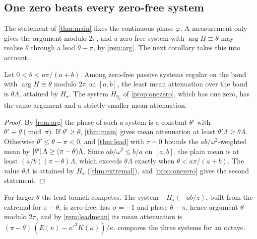 \subsection{One zero beats every zero-free system}

The statement of \cref{thm:main} fixes the continuous phase $\varphi$. A
measurement only gives the argument modulo $2\pi$, and a zero-free system
with $\arg H\equiv\theta$ may realise $\theta$ through a lead $\theta-\pi$, by
\cref{rem:arg}. The next corollary takes this into account.

\begin{corollary}\label{cor:zerosbeat}
Let $0<\theta<a\pi/(a+b)$. Among zero-free passive systems regular on the
band with $\arg H\equiv\theta$ modulo $2\pi$ on $[a,b]$, the least mean
attenuation over the band is $\theta\Lambda$, attained by $H_\star$. The
system $H_{\eta_\theta}$ of \cref{prop:onezero}, which has one zero, has the
same argument and a strictly smaller mean attenuation.
\end{corollary}

\begin{proof}
By \cref{rem:arg} the phase of such a system is a constant $\theta'$ with
$\theta'\equiv\theta\pmod\pi$. If $\theta'\ge\theta$, \cref{thm:main} gives
mean attenuation at least $\theta'\Lambda\ge\theta\Lambda$. Otherwise
$\theta'\le\theta-\pi<0$, and \cref{thm:lead} with $\tau=0$ bounds the
$ab/\omega^2$-weighted mean by $\left|\theta'\right|\Lambda\ge(\pi-\theta)\Lambda$.
Since $ab/\omega^2\le b/a$ on $[a,b]$, the plain mean is at least
$(a/b)(\pi-\theta)\Lambda$, which exceeds $\theta\Lambda$ exactly when
$\theta<a\pi/(a+b)$. The value $\theta\Lambda$ is attained by $H_\star$
(\cref{thm:extremal}), and \cref{prop:onezero} gives the second statement.
\end{proof}

For larger $\theta$ the lead branch competes. The system
$-H_\star(-ab/z)$, built from the extremal for $\pi-\theta$, is zero-free, has
$\sigma=-1$ and phase $\theta-\pi$, hence argument $\theta$ modulo $2\pi$, and
by \cref{rem:leadmean} its mean attenuation is
$(\pi-\theta)\,(E(\kappa)-\kappa'^2K(\kappa))/\kappa$.  compares the
three systems for an octave.

